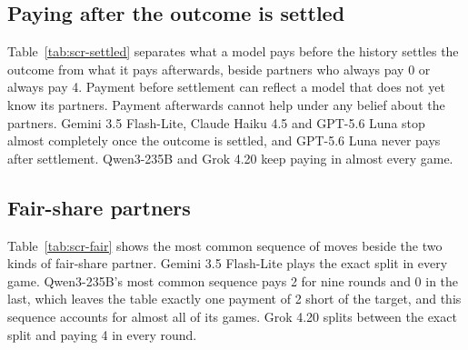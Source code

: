 \documentclass[10pt]{article}
\let\plainsubsection\subsection
\renewcommand{\subsection}{\FloatBarrier\needspace{8\baselineskip}\plainsubsection}
\begin{document}
\subsection{Paying after the outcome is settled}

Table~\ref{tab:scr-settled} separates what a model pays before the history settles the outcome from what it pays afterwards, beside partners who always pay 0 or always pay 4. Payment before settlement can reflect a model that does not yet know its partners. Payment afterwards cannot help under any belief about the partners. Gemini 3.5 Flash-Lite, Claude Haiku 4.5 and GPT-5.6 Luna stop almost completely once the outcome is settled, and GPT-5.6 Luna never pays after settlement. Qwen3-235B and Grok 4.20 keep paying in almost every game.

\begin{table}[h]
\caption{Top: after which round the outcome is settled, over all 250 games with each kind of partner. Bottom: units the model seat pays per game before and after settlement (50 games per entry), the interval for the units paid after, and the number of games with no payment after settlement.}
\label{tab:scr-settled}
\centering\small

\end{table}

\subsection{Fair-share partners}

Table~\ref{tab:scr-fair} shows the most common sequence of moves beside the two kinds of fair-share partner. Gemini 3.5 Flash-Lite plays the exact split in every game. Qwen3-235B's most common sequence pays 2 for nine rounds and 0 in the last, which leaves the table exactly one payment of 2 short of the target, and this sequence accounts for almost all of its games. Grok 4.20 splits between the exact split and paying 4 in every round.

\begin{table}[h]
\caption{Beside partners who always pay 2 (top) or copy the group (bottom), pooled over five risk levels (50 games per model): games reaching the target, mean total, the most common sequence of the model's own moves and the number of games that play it, and, among games that miss the target, the most common shortfall and how many games have it. Empty cells: no game missed.}
\label{tab:scr-fair}
\centering\small

\end{table}
\end{document}
